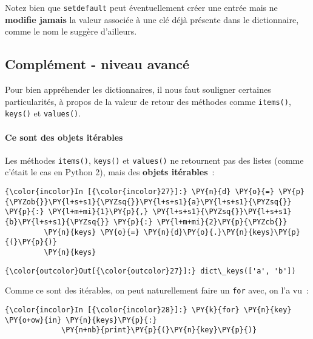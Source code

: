     Notez bien que \texttt{setdefault} peut éventuellement créer une entrée
mais ne \textbf{modifie jamais} la valeur associée à une clé déjà
présente dans le dictionnaire, comme le nom le suggère d'ailleurs.

    \hypertarget{compluxe9ment---niveau-avancuxe9}{%
\subsection{Complément - niveau
avancé}\label{compluxe9ment---niveau-avancuxe9}}

    Pour bien appréhender les dictionnaires, il nous faut souligner
certaines particularités, à propos de la valeur de retour des méthodes
comme \texttt{items()}, \texttt{keys()} et \texttt{values()}.

    \hypertarget{ce-sont-des-objets-ituxe9rables}{%
\paragraph{Ce sont des objets
itérables}\label{ce-sont-des-objets-ituxe9rables}}

    Les méthodes \texttt{items()}, \texttt{keys()} et \texttt{values()} ne
retournent pas des listes (comme c'était le cas en Python 2), mais des
\textbf{objets itérables}~:

    \begin{Verbatim}[commandchars=\\\{\},frame=single,framerule=0.3mm,rulecolor=\color{cellframecolor}]
{\color{incolor}In [{\color{incolor}27}]:} \PY{n}{d} \PY{o}{=} \PY{p}{\PYZob{}}\PY{l+s+s1}{\PYZsq{}}\PY{l+s+s1}{a}\PY{l+s+s1}{\PYZsq{}} \PY{p}{:} \PY{l+m+mi}{1}\PY{p}{,} \PY{l+s+s1}{\PYZsq{}}\PY{l+s+s1}{b}\PY{l+s+s1}{\PYZsq{}} \PY{p}{:} \PY{l+m+mi}{2}\PY{p}{\PYZcb{}}
         \PY{n}{keys} \PY{o}{=} \PY{n}{d}\PY{o}{.}\PY{n}{keys}\PY{p}{(}\PY{p}{)}
         \PY{n}{keys}
\end{Verbatim}


\begin{Verbatim}[commandchars=\\\{\},frame=single,framerule=0.3mm,rulecolor=\color{cellframecolor}]
{\color{outcolor}Out[{\color{outcolor}27}]:} dict\_keys(['a', 'b'])
\end{Verbatim}
            
    Comme ce sont des itérables, on peut naturellement faire un \texttt{for}
avec, on l'a vu~:

    \begin{Verbatim}[commandchars=\\\{\},frame=single,framerule=0.3mm,rulecolor=\color{cellframecolor}]
{\color{incolor}In [{\color{incolor}28}]:} \PY{k}{for} \PY{n}{key} \PY{o+ow}{in} \PY{n}{keys}\PY{p}{:}
             \PY{n+nb}{print}\PY{p}{(}\PY{n}{key}\PY{p}{)}
\end{Verbatim}


